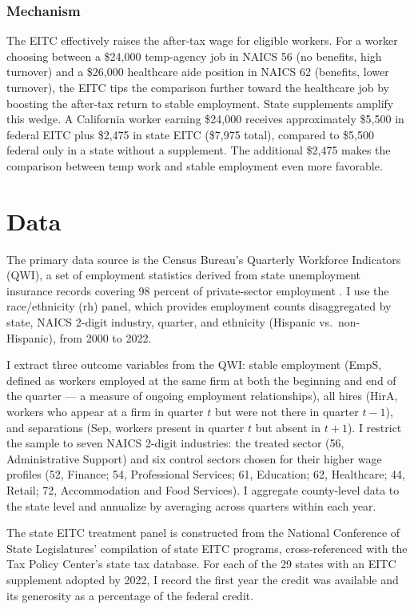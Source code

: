 \documentclass[12pt]{article}
\begin{document}
\subsubsection*{Mechanism} The EITC effectively raises the after-tax wage for eligible workers. For a worker choosing between a \$24{,}000 temp-agency job in NAICS 56 (no benefits, high turnover) and a \$26{,}000 healthcare aide position in NAICS 62 (benefits, lower turnover), the EITC tips the comparison further toward the healthcare job by boosting the after-tax return to stable employment. State supplements amplify this wedge. A California worker earning \$24{,}000 receives approximately \$5{,}500 in federal EITC plus \$2{,}475 in state EITC (\$7{,}975 total), compared to \$5{,}500 federal only in a state without a supplement. The additional \$2{,}475 makes the comparison between temp work and stable employment even more favorable.

\section{Data}

The primary data source is the Census Bureau's Quarterly Workforce Indicators (QWI), a set of employment statistics derived from state unemployment insurance records covering 98 percent of private-sector employment \citep{abowd2009lehd}. I use the race/ethnicity (rh) panel, which provides employment counts disaggregated by state, NAICS 2-digit industry, quarter, and ethnicity (Hispanic vs.\ non-Hispanic), from 2000 to 2022.

I extract three outcome variables from the QWI: stable employment (EmpS, defined as workers employed at the same firm at both the beginning and end of the quarter --- a measure of ongoing employment relationships), all hires (HirA, workers who appear at a firm in quarter $t$ but were not there in quarter $t-1$), and separations (Sep, workers present in quarter $t$ but absent in $t+1$). I restrict the sample to seven NAICS 2-digit industries: the treated sector (56, Administrative Support) and six control sectors chosen for their higher wage profiles (52, Finance; 54, Professional Services; 61, Education; 62, Healthcare; 44, Retail; 72, Accommodation and Food Services). I aggregate county-level data to the state level and annualize by averaging across quarters within each year.

The state EITC treatment panel is constructed from the National Conference of State Legislatures' compilation of state EITC programs, cross-referenced with the Tax Policy Center's state tax database. For each of the 29 states with an EITC supplement adopted by 2022, I record the first year the credit was available and its generosity as a percentage of the federal credit.
\end{document}
